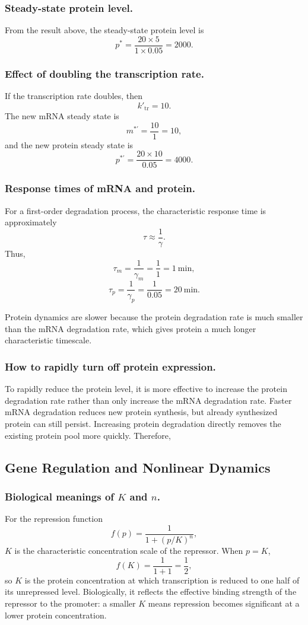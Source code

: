 \documentclass[12pt,a4paper]{article}
\begin{document}
\subsubsection{Steady-state protein level.}
From the result above, the steady-state protein level is
\[
  p^* = \frac{20\times5}{1\times0.05}=2000.
\]

\subsubsection{Effect of doubling the transcription rate.}
If the transcription rate doubles, then
\[
  k'_{\mathrm{tr}}=10.
\]
The new mRNA steady state is
\[
  m^{*\prime}=\frac{10}{1}=10,
\]
and the new protein steady state is
\[
  p^{*\prime}=\frac{20\times 10}{0.05}=4000.
\]


\subsubsection{Response times of mRNA and protein.}
For a first-order degradation process, the characteristic response time is approximately
\[
  \tau\approx \frac{1}{\gamma}.
\]
Thus,
\[
  \tau_m=\frac{1}{\gamma_m}=\frac{1}{1}=1\ \text{min},
\]
\[
  \tau_p=\frac{1}{\gamma_p}=\frac{1}{0.05}=20\ \text{min}.
\]

Protein dynamics are slower because the protein degradation rate is much smaller than the mRNA degradation rate, which gives protein a much longer characteristic timescale.

\subsubsection{How to rapidly turn off protein expression.}
To rapidly reduce the protein level, it is more effective to increase the protein degradation rate rather than only increase the mRNA degradation rate. Faster mRNA degradation reduces new protein synthesis, but already synthesized protein can still persist. Increasing protein degradation directly removes the existing protein pool more quickly. Therefore,

\subsection{Gene Regulation and Nonlinear Dynamics}
\subsubsection{Biological meanings of \texorpdfstring{$K$}{K} and \texorpdfstring{$n$}{n}.}
For the repression function
\[
  f(p)=\frac{1}{1+(p/K)^n},
\]
$K$ is the characteristic concentration scale of the repressor. When $p=K$,
\[
  f(K)=\frac{1}{1+1}=\frac{1}{2},
\]
so $K$ is the protein concentration at which transcription is reduced to one half of its unrepressed level. Biologically, it reflects the effective binding strength of the repressor to the promoter: a smaller $K$ means repression becomes significant at a lower protein concentration.
\end{document}
